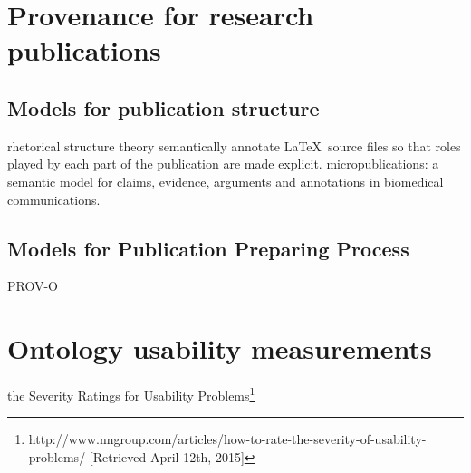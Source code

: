 \section{Provenance for research publications}
\subsection{Models for publication structure}
\cite{taboada2006rhetorical} rhetorical structure theory
\cite{groza2007salt} semantically annotate \LaTeX \ source files so that roles played by each part of the publication are made explicit.
\cite{clark2013micropublications} micropublications: a semantic model for claims, evidence, arguments and annotations in biomedical communications.
\subsection{Models for Publication Preparing Process}
PROV-O

\section{Ontology usability measurements}
the Severity Ratings for Usability Problems\footnote{http://www.nngroup.com/articles/how-to-rate-the-severity-of-usability-problems/ [Retrieved April 12th, 2015]}

